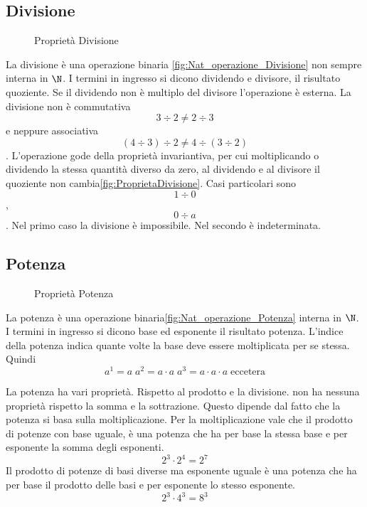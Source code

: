 \subsection{Divisione}
\label{sec:Numerinatdiv}
\begin{figure} %
	\centering

	\caption{Proprietà Divisione}
	\label{fig:ProprietaDivisione}
	\end{figure}
La divisione è una operazione binaria \nobs\vref{fig:Nat_operazione_Divisione} non sempre interna in $\N$. I termini in ingresso si dicono dividendo e divisore, il risultato quoziente. Se il dividendo non è  multiplo  del divisore l'operazione è esterna. La divisione non è commutativa \[3\div2\neq2\div3\] e neppure associativa \[(4\div3)\div2\neq4\div(3\div2)\]. L'operazione gode della proprietà invariantiva, per cui moltiplicando  o dividendo la stessa quantità diverso da zero, al dividendo e al divisore il quoziente non cambia\nobs\vref{fig:ProprietaDivisione}. Casi particolari sono \[1\div0\], \[0\div a\]. Nel primo caso la divisione è impossibile. Nel secondo è indeterminata.
\subsection{Potenza}
\label{sec:NumerinatPot}
\begin{figure} %
	\centering

	\caption{Proprietà Potenza}
	\label{fig:ProprietaPotenza}\end{figure}
La potenza è una operazione binaria\nobs\vref{fig:Nat_operazione_Potenza}  interna in $\N$. I termini in ingresso si dicono base ed esponente il risultato potenza. L'indice della potenza indica quante volte la base deve essere moltiplicata per se stessa. Quindi\[a^1=a\; a^2=a\cdot a\; a^3=a\cdot a\cdot a\; \text{eccetera} \] 

La potenza ha vari proprietà. Rispetto al prodotto e la divisione. non ha nessuna proprietà rispetto la somma e la sottrazione. Questo dipende dal fatto che la potenza si basa sulla moltiplicazione. 
Per la moltiplicazione vale che il prodotto di potenze con base uguale, è una potenza che ha per base la stessa base e per esponente la somma degli esponenti.\[ 2^3\cdot 2^4=2^7 \] Il prodotto di potenze di basi diverse ma esponente uguale è una potenza che ha per base il prodotto delle basi e per esponente lo stesso esponente.\[2^3\cdot 4^3=8^3\] 

